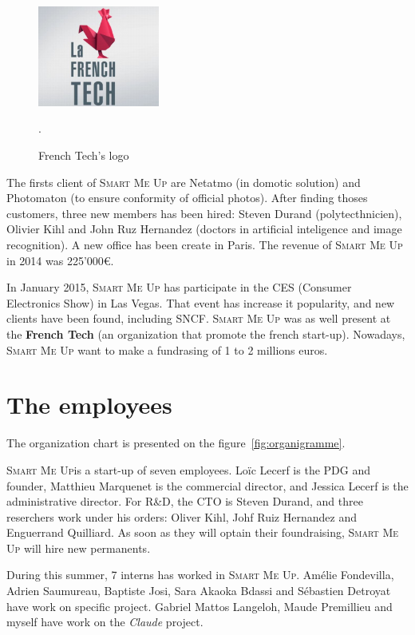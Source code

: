 \documentclass[a4paper,11pt]{custom}
\newcommand{\smu}{\textsc{Smart Me Up}}
\newcommand{\claude}{\textit{Claude}}
\begin{document}
\begin{figure}
  \centering
  \includegraphics[width=4cm]{french-tech.jpg}
  \label{fig:frenchtech}
  \caption{French Tech's logo}.
\end{figure}

The firsts client of \smu{} are Netatmo (in domotic solution) and Photomaton (to
ensure conformity of official photos). After finding thoses customers, three new
members has been hired: Steven Durand (polytecthnicien), Olivier Kihl and John
Ruz Hernandez (doctors in artificial inteligence and image recognition). A new
office has been create in Paris. The revenue of \smu{} in 2014 was 225'000\euro.

In January 2015, \smu{} has participate in the CES (Consumer Electronics Show) in
Las Vegas. That event has increase it popularity, and new clients have been
found, including SNCF. \smu{} was as well present at the \textbf{French Tech}
(an organization that promote the french start-up). Nowadays, \smu{} want to
make a fundrasing of 1 to 2 millions euros.

\section{The employees}

The organization chart is presented on the figure~\ref{fig:organigramme}.

\smu is a start-up of seven employees. Loïc Lecerf is the PDG and founder,
Matthieu Marquenet is the commercial director, and Jessica Lecerf is the
administrative director. For R\&D, the CTO is Steven Durand, and three
reserchers work under his orders: Oliver Kihl, Johf Ruiz Hernandez and
Enguerrand Quilliard. As soon as they will optain their foundraising, \smu{}
will hire new permanents.

During this summer, 7 interns has worked in \smu. Amélie Fondevilla, Adrien
Saumureau, Baptiste Josi, Sara Akaoka Bdassi and Sébastien Detroyat have work on
specific project. Gabriel Mattos Langeloh, Maude Premillieu and myself have work
on the \claude{} project.
\end{document}
